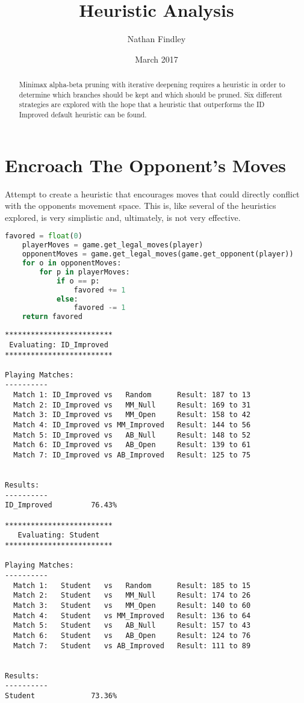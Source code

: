 \documentclass[10pt, a4paper]{article}
\title{Heuristic Analysis}
\author{Nathan Findley}
\date{March 2017}
\begin{document}
\maketitle
\tableofcontents

\begin{abstract}

Minimax alpha-beta pruning with iterative deepening requires a heuristic in
order to determine which branches should be kept and which should be pruned.
Six different strategies are explored with the hope that a heuristic that outperforms
the ID Improved default heuristic can be found.

\end{abstract}

\section{Encroach The Opponent's Moves}

Attempt to create a heuristic that encourages moves that could directly conflict with
the opponents movement space.  This is, like several of the heuristics explored, is
very simplistic and, ultimately, is not very effective.

\begin{lstlisting}[language=Python]
    favored = float(0)
    playerMoves = game.get_legal_moves(player)
    opponentMoves = game.get_legal_moves(game.get_opponent(player))
    for o in opponentMoves:
        for p in playerMoves:
            if o == p:
                favored += 1
            else:
                favored -= 1
    return favored
\end{lstlisting}

\begin{verbatim}
*************************
 Evaluating: ID_Improved 
*************************

Playing Matches:
----------
  Match 1: ID_Improved vs   Random    	Result: 187 to 13
  Match 2: ID_Improved vs   MM_Null   	Result: 169 to 31
  Match 3: ID_Improved vs   MM_Open   	Result: 158 to 42
  Match 4: ID_Improved vs MM_Improved 	Result: 144 to 56
  Match 5: ID_Improved vs   AB_Null   	Result: 148 to 52
  Match 6: ID_Improved vs   AB_Open   	Result: 139 to 61
  Match 7: ID_Improved vs AB_Improved 	Result: 125 to 75


Results:
----------
ID_Improved         76.43%

*************************
   Evaluating: Student   
*************************

Playing Matches:
----------
  Match 1:   Student   vs   Random    	Result: 185 to 15
  Match 2:   Student   vs   MM_Null   	Result: 174 to 26
  Match 3:   Student   vs   MM_Open   	Result: 140 to 60
  Match 4:   Student   vs MM_Improved 	Result: 136 to 64
  Match 5:   Student   vs   AB_Null   	Result: 157 to 43
  Match 6:   Student   vs   AB_Open   	Result: 124 to 76
  Match 7:   Student   vs AB_Improved 	Result: 111 to 89


Results:
----------
Student             73.36%
\end{verbatim}
\end{document}
